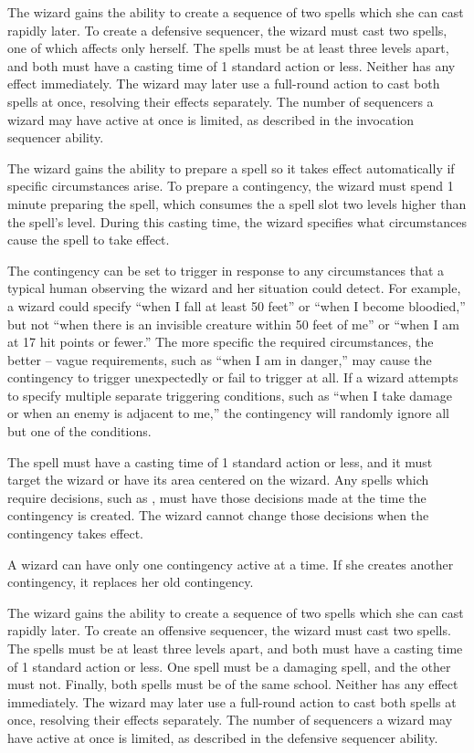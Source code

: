  The wizard gains the ability to create a sequence of two spells which she can cast rapidly later. To create a defensive sequencer, the wizard must cast two spells, one of which affects only herself. The spells must be at least three levels apart, and both must have a casting time of 1 standard action or less. Neither has any effect immediately. The wizard may later use a full-round action to cast both spells at once, resolving their effects separately. The number of sequencers a wizard may have active at once is limited, as described in the invocation sequencer ability.

 The wizard gains the ability to prepare a spell so it takes effect automatically if specific circumstances arise. To prepare a contingency, the wizard must spend 1 minute preparing the spell, which consumes the a spell slot two levels higher than the spell's level. During this casting time, the wizard specifies what circumstances cause the spell to take effect.

The contingency can be set to trigger in response to any circumstances that a typical human observing the wizard and her situation could detect. For example, a wizard could specify ``when I fall at least 50 feet'' or ``when I become bloodied,'' but not ``when there is an invisible creature within 50 feet of me'' or ``when I am at 17 hit points or fewer.'' The more specific the required circumstances, the better -- vague requirements, such as ``when I am in danger,'' may cause the contingency to trigger unexpectedly or fail to trigger at all. If a wizard attempts to specify multiple separate triggering conditions, such as ``when I take damage or when an enemy is adjacent to me,'' the contingency will randomly ignore all but one of the conditions.

The spell must have a casting time of 1 standard action or less, and it must target the wizard or have its area centered on the wizard. Any spells which require decisions, such as , must have those decisions made at the time the contingency is created. The wizard cannot change those decisions when the contingency takes effect.

A wizard can have only one contingency active at a time. If she creates another contingency, it replaces her old contingency.

 The wizard gains the ability to create a sequence of two spells which she can cast rapidly later. To create an offensive sequencer, the wizard must cast two spells. The spells must be at least three levels apart, and both must have a casting time of 1 standard action or less. One spell must be a damaging spell, and the other must not. Finally, both spells must be of the same school. Neither has any effect immediately. The wizard may later use a full-round action to cast both spells at once, resolving their effects separately. The number of sequencers a wizard may have active at once is limited, as described in the defensive sequencer ability.

